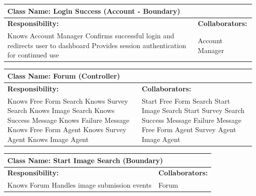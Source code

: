 \documentclass[]{article}
\begin{document}
	\begin{table}[H]
	    \centering
	    \begin{tabular}{|p{7cm}|p{7cm}|}
	    \hline 
	     \multicolumn{2}{|l|}{\textbf{Class Name: Login Success (Account - Boundary)}} \\
	    \hline
	    \textbf{Responsibility:} & \textbf{Collaborators:} \\
	    \hline
	    Knows Account Manager \newline
	    Confirms successful login and redirects user to dashboard \newline
	    Provides session authentication for continued use & 		
	    Account Manager \\
	    \hline
	    \end{tabular}
	\end{table}
	\begin{table}[H]
		\centering
		\begin{tabular}{|p{7cm}|p{7cm}|}
		\hline 
		 \multicolumn{2}{|l|}{\textbf{Class Name: Forum (Controller)}} \\
		\hline
		\textbf{Responsibility:} & \textbf{Collaborators:} \\
		\hline
		Knows Free Form Search \newline
		Knows Survey Search \newline
		Knows Image Search \newline
		Knows Success Message \newline
		Knows Failure Message \newline
		Knows Free Form Agent \newline
		Knows Survey Agent \newline
		Knows Image Agent & 		
		Start Free Form Search \newline
		Start Image Search \newline
		Start Survey Search \newline
		Success Message \newline
		Failure Message \newline
		Free Form Agent \newline
		Survey Agent \newline
		Image Agent \\
		\hline
		\end{tabular}
	\end{table}		
	\begin{table}[H]
		\centering
		\begin{tabular}{|p{7cm}|p{7cm}|}
		\hline 
		 \multicolumn{2}{|l|}{\textbf{Class Name: Start Image Search (Boundary)}} \\
		\hline
		\textbf{Responsibility:} & \textbf{Collaborators:} \\
		\hline
		Knows Forum \newline
		Handles image submission events & Forum \\
		\hline
		\end{tabular}
	\end{table}
\end{document}
